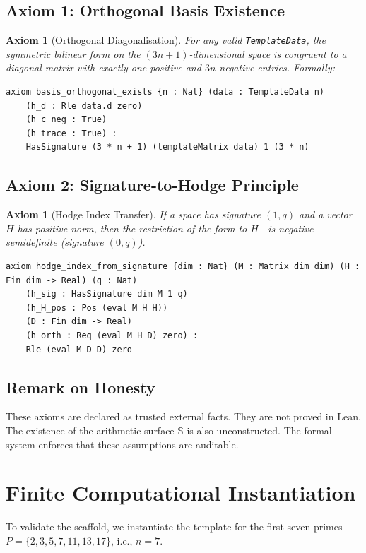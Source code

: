 \documentclass[11pt]{nyjm}
\newtheorem{axiom}[theorem]{Axiom}
\theoremstyle{definition}
\begin{document}
\subsection{Axiom 1: Orthogonal Basis Existence}
\begin{axiom}[Orthogonal Diagonalisation]
For any valid \texttt{TemplateData}, the symmetric bilinear form on the $(3n+1)$-dimensional space is congruent to a diagonal matrix with exactly one positive and $3n$ negative entries. Formally:
\begin{lstlisting}
axiom basis_orthogonal_exists {n : Nat} (data : TemplateData n)
    (h_d : Rle data.d zero)
    (h_c_neg : True)
    (h_trace : True) :
    HasSignature (3 * n + 1) (templateMatrix data) 1 (3 * n)
\end{lstlisting}
\end{axiom}

\subsection{Axiom 2: Signature-to-Hodge Principle}
\begin{axiom}[Hodge Index Transfer]
If a space has signature $(1, q)$ and a vector $H$ has positive norm, then the restriction of the form to $H^\perp$ is negative semidefinite (signature $(0, q)$).
\begin{lstlisting}
axiom hodge_index_from_signature {dim : Nat} (M : Matrix dim dim) (H : Fin dim -> Real) (q : Nat)
    (h_sig : HasSignature dim M 1 q)
    (h_H_pos : Pos (eval M H H))
    (D : Fin dim -> Real)
    (h_orth : Req (eval M H D) zero) :
    Rle (eval M D D) zero
\end{lstlisting}
\end{axiom}

\subsection{Remark on Honesty}
These axioms are declared as trusted external facts. They are not proved in Lean. The existence of the arithmetic surface $\mathbb{S}$ is also unconstructed. The formal system enforces that these assumptions are auditable.

\section{Finite Computational Instantiation}
To validate the scaffold, we instantiate the template for the first seven primes \(P = \{2,3,5,7,11,13,17\}\), i.e., \(n=7\).
\end{document}
